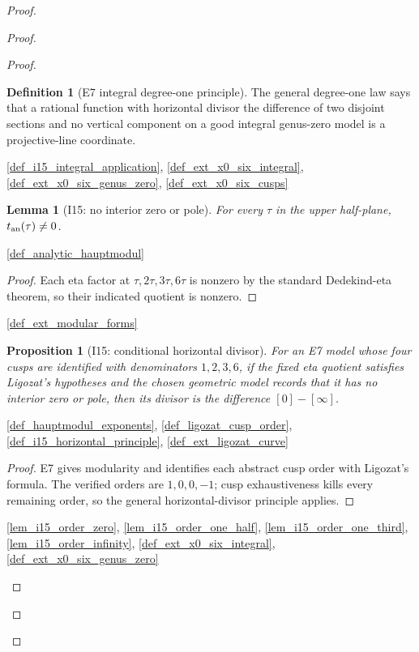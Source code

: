 \documentclass[11pt,a4paper]{article}
\numberwithin{equation}{section}
\theoremstyle{plain}\newtheorem{theorem}{Theorem}[section]\newaliascnt{proposition}{theorem}\newtheorem{proposition}[proposition]{Proposition}\aliascntresetthe{proposition}\newaliascnt{lemma}{theorem}\newtheorem{lemma}[lemma]{Lemma}\aliascntresetthe{lemma}
\theoremstyle{definition}\newaliascnt{definition}{theorem}\newtheorem{definition}[definition]{Definition}\aliascntresetthe{definition}\newaliascnt{notation}{theorem}\newtheorem{notation}[notation]{Notation}\aliascntresetthe{notation}
\providecommand{\lean}[1]{}\providecommand{\leanok}{}
\begin{document}
\begin{proof}
\begin{proof}
\begin{proof}
\begin{definition}[E7 integral degree-one principle]\label{def_i15_degree_one_principle}\lean{SptCM.RolenLiterature.E7IntegralDegreeOneCriterion}\leanok
The general degree-one law says that a rational function with horizontal
divisor the difference of two disjoint sections and no vertical component on
a good integral genus-zero model is a projective-line coordinate.
\end{definition}
\begin{uses-statement}\ref{def_i15_integral_application}, \ref{def_ext_x0_six_integral}, \ref{def_ext_x0_six_genus_zero}, \ref{def_ext_x0_six_cusps}\end{uses-statement}

\begin{lemma}[I15: no interior zero or pole]\label{lem_i15_analytic_hauptmodul_ne_zero}\lean{SptCM.CM.Repaired.analyticHauptmodul_ne_zero}\leanok
For every $\tau$ in the upper half-plane, $t_{\rm an}(\tau)\ne0$.
\end{lemma}
\begin{uses-statement}\ref{def_analytic_hauptmodul}\end{uses-statement}
\begin{proof}Each eta factor at $\tau,2\tau,3\tau,6\tau$ is nonzero by the standard Dedekind-eta theorem, so their indicated quotient is nonzero.\end{proof}
\begin{uses-proof}\ref{def_ext_modular_forms}\end{uses-proof}

\begin{proposition}[I15: conditional horizontal divisor]\label{prop_i15_horizontal_divisor}\lean{SptCM.CM.Repaired.hauptmodul_horizontal_divisor_of_E7}\leanok
For an E7 model whose four cusps are identified with denominators
$1,2,3,6$, if the fixed eta quotient satisfies Ligozat's hypotheses and the
chosen geometric model records that it has no interior zero or pole, then its
divisor is the difference $[0]-[\infty]$.
\end{proposition}
\begin{uses-statement}\ref{def_hauptmodul_exponents}, \ref{def_ligozat_cusp_order}, \ref{def_i15_horizontal_principle}, \ref{def_ext_ligozat_curve}\end{uses-statement}
\begin{proof}
E7 gives modularity and identifies each abstract cusp order with Ligozat's
formula.  The verified orders are $1,0,0,-1$; cusp exhaustiveness kills every
remaining order, so the general horizontal-divisor principle applies.
\end{proof}
\begin{uses-proof}\ref{lem_i15_order_zero}, \ref{lem_i15_order_one_half},
\ref{lem_i15_order_one_third}, \ref{lem_i15_order_infinity},
\ref{def_ext_x0_six_integral}, \ref{def_ext_x0_six_genus_zero}\end{uses-proof}


\end{proof}
\end{proof}
\end{proof}
\end{document}
